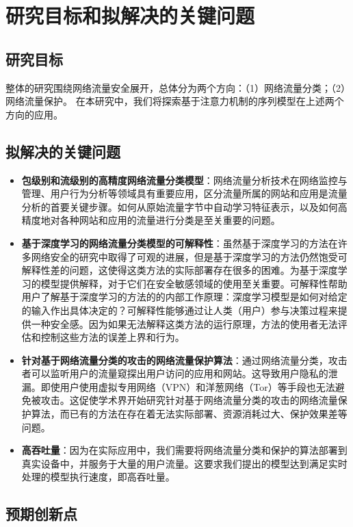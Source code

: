\documentclass[degree=master,cjk-font=noto]{thuthesis}
\begin{document}
\chapter{研究目标和拟解决的关键问题}

\section{研究目标}

整体的研究围绕网络流量安全展开，总体分为两个方向：（1）网络流量分类；（2）网络流量保护。
在本研究中，我们将探索基于注意力机制的序列模型在上述两个方向的应用。

\section{拟解决的关键问题}

\begin{itemize}
	\item \textbf{包级别和流级别的高精度网络流量分类模型}：网络流量分析技术在网络监控与管理、用户行为分析等领域具有重要应用，区分流量所属的网站和应用是流量分析的首要关键步骤。如何从原始流量字节中自动学习特征表示，以及如何高精度地对各种网站和应用的流量进行分类是至关重要的问题。
	\item \textbf{基于深度学习的网络流量分类模型的可解释性}：虽然基于深度学习的方法在许多网络安全的研究中取得了可观的进展，但是基于深度学习的方法仍然饱受可解释性差的问题，这使得这类方法的实际部署存在很多的困难。为基于深度学习的模型提供解释，对于它们在安全敏感领域的使用至关重要。可解释性帮助用户了解基于深度学习的方法的的内部工作原理：深度学习模型是如何对给定的输入作出具体决定的？可解释性能够通过让人类（用户）参与决策过程来提供一种安全感。因为如果无法解释这类方法的运行原理，方法的使用者无法评估和控制这些方法的误差上界和行为。
	\item \textbf{针对基于网络流量分类的攻击的网络流量保护算法}：通过网络流量分类，攻击者可以监听用户的流量窥探出用户访问的应用和网站。这导致用户隐私的泄漏。即使用户使用虚拟专用网络（VPN）和洋葱网络（Tor）等手段也无法避免被攻击。这促使学术界开始研究针对基于网络流量分类的攻击的网络流量保护算法，而已有的方法在存在着无法实际部署、资源消耗过大、保护效果差等问题。
	\item \textbf{高吞吐量}：因为在实际应用中，我们需要将网络流量分类和保护的算法部署到真实设备中，并服务于大量的用户流量。这要求我们提出的模型达到满足实时处理的模型执行速度，即高吞吐量。
\end{itemize}


\section{预期创新点}
\end{document}

